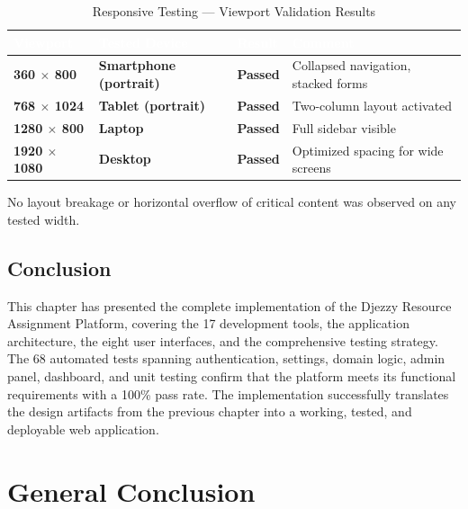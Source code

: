 \documentclass{bts-report}
\begin{document}
\begin{table}[H]
  \centering
  \caption{Responsive Testing --- Viewport Validation Results}
  \vspace{0.2cm}
  \begin{tabularx}{\textwidth}{|>{\bfseries}p{3.4cm}|>{\bfseries}p{4.2cm}|>{\bfseries}p{2.2cm}|X|}
    \hline
    \rowcolor{tableheader}
    \textcolor{white}{\textbf{Viewport}} & \textcolor{white}{\textbf{Tested Device}} & \textcolor{white}{\textbf{Result}} & \textcolor{white}{\textbf{Comment}} \\
    \hline
    360 $\times$ 800 & Smartphone (portrait) & Passed & Collapsed navigation, stacked forms \\
    \hline
    768 $\times$ 1024 & Tablet (portrait) & Passed & Two-column layout activated \\
    \hline
    1280 $\times$ 800 & Laptop & Passed & Full sidebar visible \\
    \hline
    1920 $\times$ 1080 & Desktop & Passed & Optimized spacing for wide screens \\
    \hline
  \end{tabularx}
\end{table}

No layout breakage or horizontal overflow of critical content was observed on any tested width.

\section*{Conclusion}
This chapter has presented the complete implementation of the Djezzy Resource Assignment Platform, covering the 17 development tools, the application architecture, the eight user interfaces, and the comprehensive testing strategy. The 68 automated tests spanning authentication, settings, domain logic, admin panel, dashboard, and unit testing confirm that the platform meets its functional requirements with a 100\% pass rate. The implementation successfully translates the design artifacts from the previous chapter into a working, tested, and deployable web application.

\backmatter

\chapter*{General Conclusion}
\end{document}
